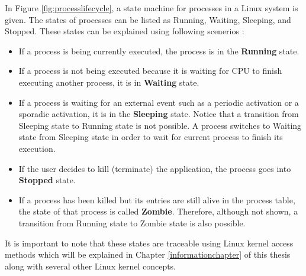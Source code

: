 In Figure \ref{fig:processlifecycle}, a state machine for processes in a Linux system is given. The states of processes can be listed as Running, Waiting, Sleeping, and Stopped. These states can be explained using following scenerios \cite{linuxkernelbook}:
\begin{itemize}
	\item If a process is being currently executed, the process is in the \textbf{Running} state.
	\item If a process is not being executed because it is waiting for CPU to finish executing another process, it is in \textbf{Waiting} state.
	\item If a process is waiting for an external event such as a periodic activation or a sporadic activation, it is in the \textbf{Sleeping} state. Notice that a transition from Sleeping state to Running state is not possible. A process switches to Waiting state from Sleeping state in order to wait for current process to finish its execution.
	\item If the user decides to kill (terminate) the application, the process goes into \textbf{Stopped} state.
	\item If a process has been killed but its entries are still alive in the process table, the state of that process is called \textbf{Zombie}. Therefore, although not shown, a transition from Running state to Zombie state is also possible.
\end{itemize}

It is important to note that these states are traceable using Linux kernel access methods which will be explained in Chapter \ref{informationchapter} of this thesis along with several other Linux kernel concepts.

